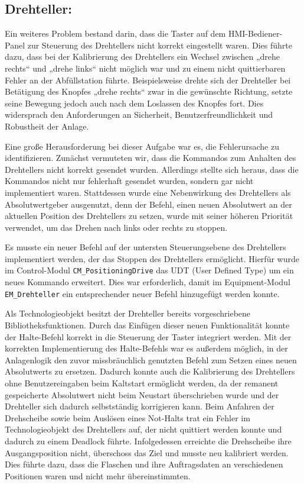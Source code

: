 \subsection{Drehteller:} 
Ein weiteres Problem bestand darin, dass die Taster auf dem HMI-Bediener-Panel zur Steuerung des Drehtellers nicht korrekt eingestellt waren. Dies führte dazu, dass bei der Kalibrierung des Drehtellers ein Wechsel zwischen „drehe rechts“ und „drehe links“ nicht möglich war und zu einem nicht quittierbaren Fehler an der Abfüllstation führte. Beispielsweise drehte sich der Drehteller bei Betätigung des Knopfes „drehe rechts“ zwar in die gewünschte Richtung, setzte seine Bewegung jedoch auch nach dem Loslassen des Knopfes fort. Dies widersprach den Anforderungen an Sicherheit, Benutzerfreundlichkeit und Robustheit der Anlage.

Eine große Herausforderung bei dieser Aufgabe war es, die Fehlerursache zu identifizieren. Zunächst vermuteten wir, dass die Kommandos zum Anhalten des Drehtellers nicht korrekt gesendet wurden. Allerdings stellte sich heraus, dass die Kommandos nicht nur fehlerhaft gesendet wurden, sondern gar nicht implementiert waren. Stattdessen wurde eine Nebenwirkung des Drehtellers als Absolutwertgeber ausgenutzt, denn der Befehl, einen neuen Absolutwert an der aktuellen Position des Drehtellers zu setzen, wurde mit seiner höheren Priorität verwendet, um das Drehen nach links oder rechts zu stoppen.

Es musste ein neuer Befehl auf der untersten Steuerungsebene des Drehtellers implementiert werden, der das Stoppen des Drehtellers ermöglicht. Hierfür wurde im Control-Modul \texttt{CM\_PositioningDrive} das UDT (User Defined Type) um ein neues Kommando erweitert. Dies war erforderlich, damit im Equipment-Modul \texttt{EM\_Drehteller} ein entsprechender neuer Befehl hinzugefügt werden konnte.

Als Technologieobjekt besitzt der Drehteller bereits vorgeschriebene Bibliotheksfunktionen. Durch das Einfügen dieser neuen Funktionalität konnte der Halte-Befehl korrekt in die Steuerung der Taster integriert werden. Mit der korrekten Implementierung des Halte-Befehls war es außerdem möglich, in der Anlagenlogik den zuvor missbräuchlich genutzten Befehl zum Setzen eines neuen Absolutwerts zu ersetzen. Dadurch konnte auch die Kalibrierung des Drehtellers ohne Benutzereingaben beim Kaltstart ermöglicht werden, da der remanent gespeicherte Absolutwert nicht beim Neustart überschrieben wurde und der Drehteller sich dadurch selbstständig korrigieren kann.
Beim Anfahren der Drehscheibe sowie beim Auslösen eines Not-Halts trat ein Fehler im Technologieobjekt des Drehtellers auf, der nicht quittiert werden konnte und dadurch zu einem Deadlock führte. Infolgedessen erreichte die Drehscheibe ihre Ausgangsposition nicht, überschoss das Ziel und musste neu kalibriert werden. Dies führte dazu, dass die Flaschen und ihre Auftragsdaten an verschiedenen Positionen waren und nicht mehr übereinstimmten.  

